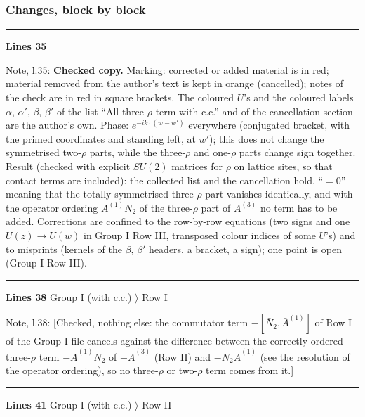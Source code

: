 \documentclass[10pt]{article}
\newenvironment{notebox}{\def\FrameCommand{{\color{notebar}\vrule width 1.5pt}\hspace{6pt}}\MakeFramed{\advance\hsize-\width\FrameRestore}\small}{\endMakeFramed}
\begin{document}
\subsubsection*{Changes, block by block}
\noindent\rule{\linewidth}{0.3pt}\par\noindent\textbf{Lines 35}\par
\begin{notebox}\textsf{\small Note, l.35:} \textbf{Checked copy.} Marking: corrected or added material is in red; material removed from the author's text is kept in orange (cancelled); notes of the check are in red in square brackets. The coloured $U$'s and the coloured labels $\alpha$, $\alpha'$, $\beta$, $\beta'$ of the list ``All three $\rho$ term with c.c.'' and of the cancellation section are the author's own. Phase: $e^{-ik\cdot(w-w')}$ everywhere (conjugated bracket, with the primed coordinates and standing left, at $w'$); this does not change the symmetrised two-$\rho$ parts, while the three-$\rho$ and one-$\rho$ parts change sign together. Result (checked with explicit $SU(2)$ matrices for $\rho$ on lattice sites, so that contact terms are included): the collected list and the cancellation hold, ``$=0$'' meaning that the totally symmetrised three-$\rho$ part vanishes identically, and with the operator ordering $A^{(1)}N_{2}$ of the three-$\rho$ part of $A^{(3)}$ no term has to be added. Corrections are confined to the row-by-row equations (two signs and one $U(z)\to U(w)$ in Group I Row III, transposed colour indices of some $U$'s) and to misprints (kernels of the $\beta$, $\beta'$ headers, a bracket, a sign); one point is open (Group I Row III).\end{notebox}
\noindent\rule{\linewidth}{0.3pt}\par\noindent\textbf{Lines 38} \quad \textsf{Group I (with c.c.) $\rangle$ Row I}\par
\begin{notebox}\textsf{\small Note, l.38:} [Checked, nothing else: the commutator term $-[\bar N_{2},\bar A^{(1)}]$ of Row I of the Group I file cancels against the difference between the correctly ordered three-$\rho$ term $-\bar A^{(1)}\bar N_{2}$ of $-\bar A^{(3)}$ (Row II) and $-\bar N_{2}\bar A^{(1)}$ (see the resolution of the operator ordering), so no three-$\rho$ or two-$\rho$ term comes from it.]\end{notebox}
\noindent\rule{\linewidth}{0.3pt}\par\noindent\textbf{Lines 41} \quad \textsf{Group I (with c.c.) $\rangle$ Row II} \par
\end{document}
